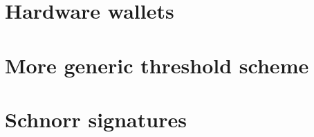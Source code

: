 \section{Hardware wallets}



\section{More generic threshold scheme}


\section{Schnorr signatures}

